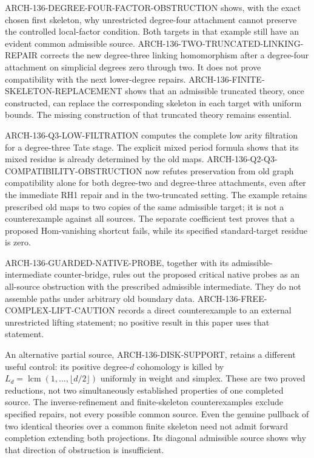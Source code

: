 \documentclass[11pt,a4paper]{article}
\begin{document}
ARCH-136-DEGREE-FOUR-FACTOR-OBSTRUCTION shows, with the exact
chosen first skeleton, why unrestricted degree-four attachment cannot
preserve the controlled local-factor condition. Both targets in that
example still have an evident common admissible source.
ARCH-136-TWO-TRUNCATED-LINKING-REPAIR corrects the new degree-three
linking homomorphism after a degree-four attachment on simplicial
degrees zero through two. It does not prove compatibility with the
next lower-degree repairs. ARCH-136-FINITE-SKELETON-REPLACEMENT
shows that an admissible truncated theory, once constructed, can
replace the corresponding skeleton in each target with uniform bounds.
The missing construction of that truncated theory remains essential.

ARCH-136-Q3-LOW-FILTRATION computes the complete low arity
filtration for a degree-three Tate stage. The explicit mixed
period formula shows that its mixed residue is already determined
by the old maps. ARCH-136-Q2-Q3-COMPATIBILITY-OBSTRUCTION now
refutes preservation from old graph compatibility alone for
both degree-two and degree-three attachments, even after the
immediate RH1 repair and in the two-truncated setting. The
example retains prescribed old maps to two copies of the same
admissible target; it is not a counterexample against all sources.
The separate coefficient test proves that a proposed Hom-vanishing
shortcut fails, while its specified standard-target residue is zero.

ARCH-136-GUARDED-NATIVE-PROBE, together with its
admissible-intermediate counter-bridge, rules out the proposed
critical native probes as an all-source obstruction with the prescribed
admissible intermediate. They do not assemble paths under arbitrary
old boundary data. ARCH-136-FREE-COMPLEX-LIFT-CAUTION records a direct
counterexample to an external unrestricted lifting statement; no
positive result in this paper uses that statement.

An alternative partial source, ARCH-136-DISK-SUPPORT, retains a
different useful control: its positive degree-$d$ cohomology is killed
by $L_d=\operatorname{lcm}(1,\ldots,\lfloor d/2\rfloor)$ uniformly
in weight and simplex. These are two proved reductions, not two
simultaneously established properties of one completed source.
The inverse-refinement and finite-skeleton counterexamples exclude
specified repairs, not every possible common source. Even the genuine
pullback of two identical theories over a common finite skeleton need
not admit forward completion extending both projections. Its diagonal
admissible source shows why that direction of obstruction is insufficient.
\end{document}
